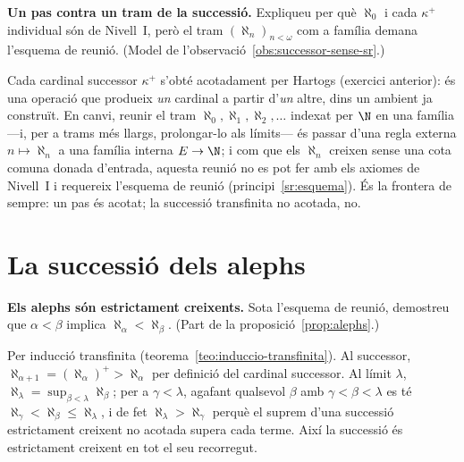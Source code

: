 \begin{exercici}
\textbf{Un pas contra un tram de la successió.} Expliqueu per què \(\aleph_0\) i cada \(\kappa^+\) individual són de Nivell~I, però el tram \((\aleph_n)_{n<\omega}\) com a família demana l'esquema de reunió. (Model de l'observació~\ref{obs:successor-sense-sr}.)
\end{exercici}
\begin{solucio}
Cada cardinal successor \(\kappa^+\) s'obté acotadament per Hartogs (exercici anterior): és una operació que produeix \emph{un} cardinal a partir d'\emph{un} altre, dins un ambient ja construït. En canvi, reunir el tram \(\aleph_0,\aleph_1,\aleph_2,\dots\) indexat per \(\N\) en una família ---i, per a trams més llargs, prolongar-lo als límits--- és passar d'una regla externa \(n\mapsto\aleph_n\) a una família interna \(E\to\N\); i com que els \(\aleph_n\) creixen sense una cota comuna donada d'entrada, aquesta reunió no es pot fer amb els axiomes de Nivell~I i requereix l'esquema de reunió (principi~\ref{sr:esquema}). És la frontera de sempre: un pas és acotat; la successió transfinita no acotada, no.
\end{solucio}

\section{La successió dels alephs}\label{prac:alephs}

\begin{exercici}
\textbf{Els alephs són estrictament creixents.} Sota l'esquema de reunió, demostreu que \(\alpha<\beta\) implica \(\aleph_\alpha<\aleph_\beta\). (Part de la proposició~\ref{prop:alephs}.)
\end{exercici}
\begin{solucio}
Per inducció transfinita (teorema~\ref{teo:induccio-transfinita}). Al successor, \(\aleph_{\alpha+1}=(\aleph_\alpha)^+>\aleph_\alpha\) per definició del cardinal successor. Al límit \(\lambda\), \(\aleph_\lambda=\sup_{\beta<\lambda}\aleph_\beta\); per a \(\gamma<\lambda\), agafant qualsevol \(\beta\) amb \(\gamma<\beta<\lambda\) es té \(\aleph_\gamma<\aleph_\beta\le\aleph_\lambda\), i de fet \(\aleph_\lambda>\aleph_\gamma\) perquè el suprem d'una successió estrictament creixent no acotada supera cada terme. Així la successió és estrictament creixent en tot el seu recorregut.
\end{solucio}

